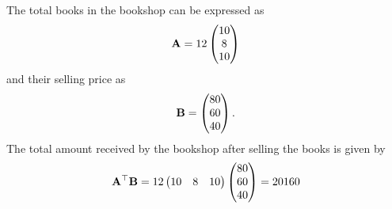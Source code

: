 The total books in the bookshop can be expressed as 
\begin{align}
    \mathbf{A} = 12 \begin{pmatrix} 10 \\ 8 \\ 10\end{pmatrix}
\end{align}
and their selling price as
%
\begin{align}
    \mathbf{B} = \begin{pmatrix} 80 \\ 60 \\ 40\end{pmatrix}.
\end{align}
The total amount received by the bookshop after selling the books is given by
\begin{align}
    \mathbf{A}^{\top}\mathbf{B} = 12 \begin{pmatrix} 10 & 8 & 10\end{pmatrix}\begin{pmatrix} 80 \\ 60 \\ 40\end{pmatrix}
    =20160
\end{align}
